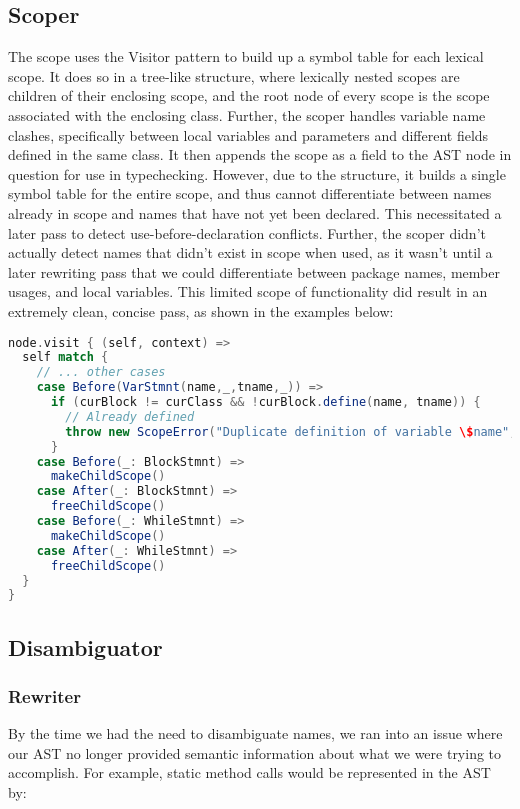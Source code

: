 \documentclass{article}
\begin{document}




\subsection{Scoper}
The scope uses the Visitor pattern to build up a symbol table for each lexical scope. It does so in a tree-like structure,
where lexically nested scopes are children of their enclosing scope, and the root node of every scope is the scope associated
with the enclosing class. Further, the scoper handles variable name clashes, specifically between local variables and parameters
and different fields defined in the same class. It then appends the scope as a field to the AST node in question for use in
typechecking. However, due to the structure, it builds a single symbol table for the entire scope, and thus cannot differentiate
between names already in scope and names that have not yet been declared. This necessitated a later pass to detect use-before-declaration
conflicts. Further, the scoper didn't actually detect names that didn't exist in scope when used, as it wasn't until a later rewriting
pass that we could differentiate between package names, member usages, and local variables. This limited scope of functionality did
result in an extremely clean, concise pass, as shown in the examples below:

\begin{lstlisting}[language=Scala]
node.visit { (self, context) =>
  self match {
    // ... other cases
    case Before(VarStmnt(name,_,tname,_)) =>
      if (curBlock != curClass && !curBlock.define(name, tname)) {
        // Already defined
        throw new ScopeError("Duplicate definition of variable \$name", self.from)
      }
    case Before(_: BlockStmnt) =>
      makeChildScope()
    case After(_: BlockStmnt) =>
      freeChildScope()
    case Before(_: WhileStmnt) =>
      makeChildScope()
    case After(_: WhileStmnt) =>
      freeChildScope()
  }
}
\end{lstlisting}



\subsection{Disambiguator}
\subsubsection{Rewriter}
By the time we had the need to disambiguate names, we ran into an issue where our AST no longer provided semantic
information about what we were trying to accomplish. For example, static method calls would be represented in the AST
by:
\end{document}
